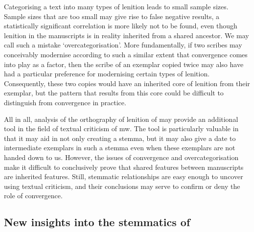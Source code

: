 Categorising a text into many types of lenition leads to small sample sizes. Sample sizes that are too small may give rise to false negative results, \ie a statistically significant correlation is more likely not to be found, even though lenition in the manuscripts is in reality inherited from a shared ancestor. We may call such a mistake `overcategorisation'. More fundamentally, if two scribes may conceivably modernise according to such a similar extent that convergence comes into play as a factor, then the scribe of an exemplar copied twice may also have had a particular preference for modernising certain types of lenition. Consequently, these two copies would have an inherited core of lenition from their exemplar, but the pattern that results from this core could be difficult to distinguish from convergence in practice.

All in all, analysis of the orthography of lenition of  may provide an additional tool in the field of textual criticism of \gls{mw}. The tool is particularly valuable in that it may aid in not only creating a stemma, but it may also give a date to intermediate exemplars in such a stemma even when these exemplars are not handed down to us. However, the issues of convergence and overcategorisation make it difficult to conclusively prove that shared features between manuscripts are inherited features. Still, stemmatic relationships are easy enough to uncover using textual criticism, and their conclusions may serve to confirm or deny the role of convergence.


\subsection{New insights into the stemmatics of }
\label{sec:new-insights-into}

